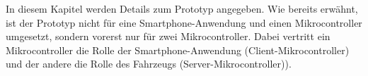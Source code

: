 In diesem Kapitel werden Details zum Prototyp angegeben. Wie bereits erwähnt, ist der Prototyp nicht für eine Smartphone-Anwendung und einen Mikrocontroller umgesetzt, sondern vorerst nur für zwei Mikrocontroller. Dabei vertritt ein Mikrocontroller die Rolle der Smartphone-Anwendung (Client-Mikrocontroller) und der andere die Rolle des Fahrzeugs (Server-Mikrocontroller)).